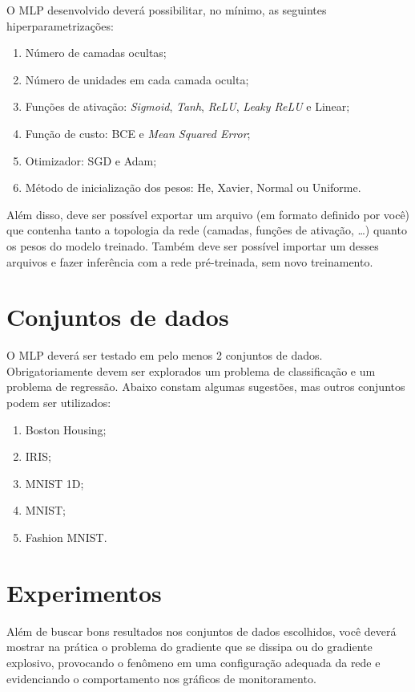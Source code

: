 \documentclass{dlproblemset}
\begin{document}
O MLP desenvolvido deverá possibilitar, no mínimo, as seguintes hiperparametrizações:

\begin{enumerate}[1)]
    \item Número de camadas ocultas;
    \item Número de unidades em cada camada oculta;
    \item Funções de ativação: \textit{Sigmoid}, \textit{Tanh}, \textit{ReLU}, \textit{Leaky ReLU} e Linear;
    \item Função de custo: BCE e \textit{Mean Squared Error};
    \item Otimizador: SGD e Adam;
    \item Método de inicialização dos pesos: He, Xavier, Normal ou Uniforme.
\end{enumerate}

Além disso, deve ser possível exportar um arquivo (em formato definido por você) que contenha tanto a topologia da rede (camadas, funções de ativação, \ldots) quanto os pesos do modelo treinado. Também deve ser possível importar um desses arquivos e fazer inferência com a rede pré-treinada, sem novo treinamento.

\section*{Conjuntos de dados}

O MLP deverá ser testado em pelo menos 2 conjuntos de dados. Obrigatoriamente devem ser explorados um problema de classificação e um problema de regressão. Abaixo constam algumas sugestões, mas outros conjuntos podem ser utilizados:

\begin{enumerate}[1)]
    \item Boston Housing;
    \item IRIS;
    \item MNIST 1D;
    \item MNIST;
    \item Fashion MNIST.
\end{enumerate}

\section*{Experimentos}

Além de buscar bons resultados nos conjuntos de dados escolhidos, você deverá mostrar na prática o problema do gradiente que se dissipa ou do gradiente explosivo, provocando o fenômeno em uma configuração adequada da rede e evidenciando o comportamento nos gráficos de monitoramento.
\end{document}
